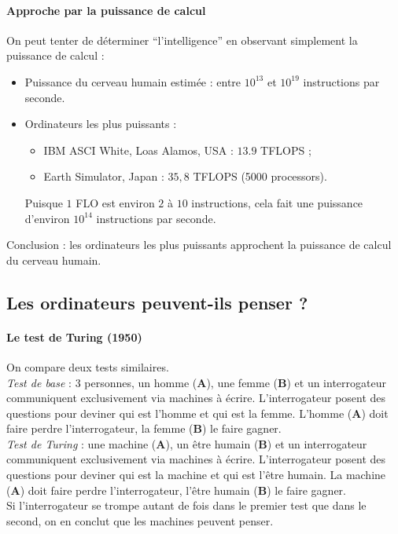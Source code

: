 \paragraph{Approche par la puissance de calcul}
On peut tenter de déterminer ``l'intelligence'' en observant simplement la puissance de calcul :
\begin{itemize}
	\item Puissance du cerveau humain estimée : entre $10^{13}$ et $10^{19}$ instructions par seconde.
	\item Ordinateurs les plus puissants :
	\begin{itemize}
	\item IBM ASCI White, Loas Alamos, USA : $13.9$ TFLOPS ;
	\item Earth Simulator, Japan : $35,8$ TFLOPS (5000 processors).
\end{itemize}
Puisque $1$ FLO est environ $2$ à $10$ instructions, cela fait une puissance d'environ $10^{14}$ instructions par seconde.
\end{itemize}
Conclusion : les ordinateurs les plus puissants approchent la puissance de calcul du cerveau humain.

\subsection{Les ordinateurs peuvent-ils penser ?}
\paragraph{Le test de Turing (1950)}
On compare deux tests similaires.\\

\emph{Test de base} : 3 personnes, un homme (\textbf{A}), une femme (\textbf{B}) et un interrogateur communiquent exclusivement via machines à écrire. L'interrogateur posent des questions pour deviner qui est l'homme et qui est la femme. L'homme (\textbf{A}) doit faire perdre l'interrogateur, la femme (\textbf{B}) le faire gagner.\\

\emph{Test de Turing} : une machine (\textbf{A}), un être humain (\textbf{B}) et un interrogateur communiquent exclusivement via machines à écrire. L'interrogateur posent des questions pour deviner qui est la machine et qui est l'être humain. La machine (\textbf{A}) doit faire perdre l'interrogateur, l'être humain (\textbf{B}) le faire gagner.\\

Si l'interrogateur se trompe autant de fois dans le premier test que dans le second, on en conclut que les machines peuvent penser.


